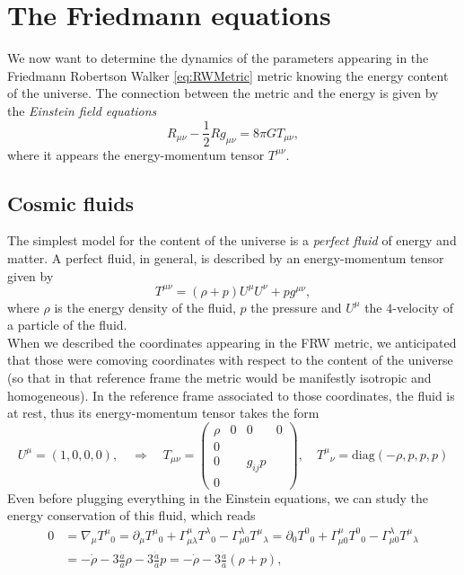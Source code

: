 \section{The Friedmann equations}
We now want to determine the dynamics of the parameters appearing in the Friedmann Robertson Walker \eqref{eq:RWMetric} metric knowing the energy content of the universe. The connection between the metric and the energy is given by the \emph{Einstein field equations}
\begin{equation}\label{eq:EFE}
    R_{\mu\nu}-\frac{1}{2}Rg_{\mu\nu}=8\pi GT_{\mu\nu},
\end{equation}
where it appears the energy-momentum tensor $T^{\mu\nu}$.
\subsection{Cosmic fluids}
The simplest model for the content of the universe is a \emph{perfect fluid} of energy and matter. A perfect fluid, in general, is described by an energy-momentum tensor given by
\begin{equation}\label{eq:PerfectFluidEMTensor}
    T^{\mu\nu}=(\rho+p)U^\mu U^\nu+pg^{\mu\nu},
\end{equation}
where $\rho$ is the energy density of the fluid, $p$ the pressure and $U^\mu$ the $4$-velocity of a particle of the fluid.\\When we described the coordinates appearing in the FRW metric, we anticipated that those were comoving coordinates with respect to the content of the universe (so that in that reference frame the metric would be manifestly isotropic and homogeneous). In the reference frame associated to those coordinates, the fluid is at rest, thus its energy-momentum tensor takes the form
\begin{equation}
    U^\mu=(1,0,0,0),\quad\Rightarrow\quad
    T_{\mu\nu}=\begin{pmatrix}
        \rho&0&0&0\\
        0&&&\\
        0&&g_{ij}p&\\
        0&&&
    \end{pmatrix},
    \quad T^\mu\phantom{} _\nu=\text{diag}(-\rho,p,p,p)\label{eq:EMTensorCosmicFluid}
\end{equation}
Even before plugging everything in the Einstein equations, we can study the energy conservation of this fluid, which reads
\begin{align}\label{eq:ConservationEnergy}
    0&=\nabla_\mu T^\mu\phantom{} _0=\partial_\mu T^\mu\phantom{} _0+\Gamma^\mu_{\mu\lambda}T^\lambda\phantom{} _0-\Gamma^\lambda_{\mu0}T^\mu\phantom{} _\lambda=\partial_0 T^0\phantom{} _0+\Gamma^\mu_{\mu0}T^0\phantom{} _0-\Gamma^\lambda_{\mu0}T^\mu\phantom{} _\lambda\nonumber\\
    &=-\dot\rho-3\frac{\dot a}{a}\rho-3\frac{\dot a}{a}p=-\dot\rho-3\frac{\dot a}{a}(\rho+p),
\end{align}
